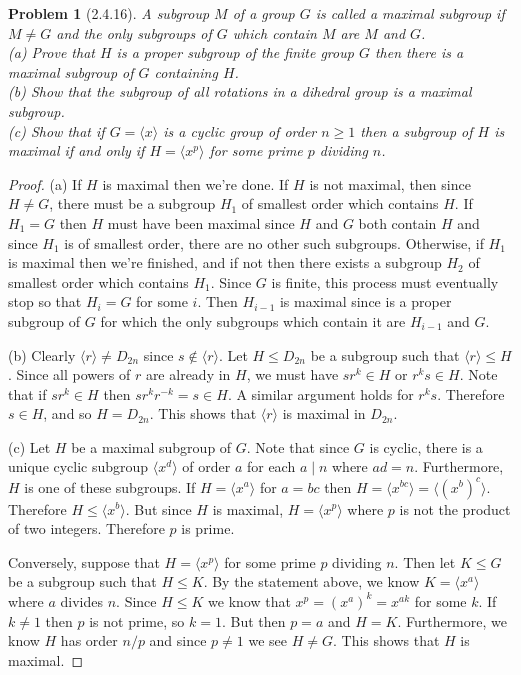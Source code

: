 \documentclass{article}
\newtheorem{problem}{Problem}
\begin{document}
\begin{problem}[2.4.16]
A subgroup $M$ of a group $G$ is called a \emph{maximal subgroup} if $M \neq G$ and the only subgroups of $G$ which contain $M$ are $M$ and $G$.\\
(a) Prove that $H$ is a proper subgroup of the finite group $G$ then there is a maximal subgroup of $G$ containing $H$.\\
(b) Show that the subgroup of all rotations in a dihedral group is a maximal subgroup.\\
(c) Show that if $G = \langle x \rangle$ is a cyclic group of order $n \geq 1$ then a subgroup of $H$ is maximal if and only if $H = \langle x^p \rangle$ for some prime $p$ dividing $n$.
\end{problem}
\begin{proof}
(a) If $H$ is maximal then we're done. If $H$ is not maximal, then since $H \neq G$, there must be a subgroup $H_1$ of smallest order which contains $H$. If $H_1 = G$ then $H$ must have been maximal since $H$ and $G$ both contain $H$ and since $H_1$ is of smallest order, there are no other such subgroups. Otherwise, if $H_1$ is maximal then we're finished, and if not then there exists a subgroup $H_2$ of smallest order which contains $H_1$. Since $G$ is finite, this process must eventually stop so that $H_i = G$ for some $i$. Then $H_{i-1}$ is maximal since is a proper subgroup of $G$ for which the only subgroups which contain it are $H_{i-1}$ and $G$.

(b) Clearly $\langle r \rangle \neq D_{2n}$ since $s \notin \langle r \rangle$. Let $H \leq D_{2n}$ be a subgroup such that $\langle r \rangle \leq H$. Since all powers of $r$ are already in $H$, we must have $sr^{k} \in H$ or $r^{k}s \in H$. Note that if $sr^{k} \in H$ then $sr^{k}r^{-k} = s \in H$. A similar argument holds for $r^ks$. Therefore $s \in H$, and so $H = D_{2n}$. This shows that $\langle r \rangle$ is maximal in $D_{2n}$.

(c) Let $H$ be a maximal subgroup of $G$. Note that since $G$ is cyclic, there is a unique cyclic subgroup $\langle x^d \rangle$ of order $a$ for each $a \mid n$ where $ad = n$. Furthermore, $H$ is one of these subgroups. If $H = \langle x^a \rangle$ for $a = bc$ then $H = \langle x^{bc} \rangle = \langle (x^b)^c \rangle$. Therefore $H \leq \langle x^b \rangle$. But since $H$ is maximal, $H = \langle x^p \rangle$ where $p$ is not the product of two integers. Therefore $p$ is prime.

Conversely, suppose that $H = \langle x^p \rangle$ for some prime $p$ dividing $n$. Then let $K \leq G$ be a subgroup such that $H \leq K$. By the statement above, we know $K = \langle x^a \rangle$ where $a$ divides $n$. Since $H \leq K$ we know that $x^p = (x^a)^k = x^{ak}$ for some $k$. If $k \neq 1$ then $p$ is not prime, so $k = 1$. But then $p = a$ and $H = K$. Furthermore, we know $H$ has order $n/p$ and since $p \neq 1$ we see $H \neq G$. This shows that $H$ is maximal.
\end{proof}
\end{document}
